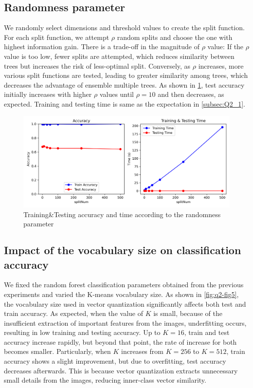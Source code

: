 \subsection{Randomness parameter}
We randomly select dimensions and threshold values to create the split function. For each split function, we attempt $\rho$ random splits and choose the one with highest information gain. There is a trade-off in the magnitude of $\rho$ value: If the $\rho$ value is too low, fewer splits are attempted, which reduces similarity between trees but increases the risk of less-optimal split. Conversely, as $\rho$ increases, more various split functions are tested, leading to greater similarity among trees, which decreases the advantage of ensemble multiple trees. As shown in \cref{fig:q2-fig4}, test accuracy initially increases with higher $\rho$ values until $\rho=10$ and then decreases, as expected. Training and testing time is same as the expectation in \cref{subsec:Q2_1}.

\begin{figure}[htbp]
	\centering
	\includegraphics[width=0.8\linewidth]{image/q2-fig4.png}
	\caption{Training\&Testing accuracy and time according to the randomness parameter}
	\label{fig:q2-fig4}
\end{figure}

\subsection{Impact of the vocabulary size on classification accuracy}
We fixed the random forest classification parameters obtained from the previous experiments and varied the K-means vocabulary size. As shown in \cref{fig:q2-fig5}, the vocabulary size used in vector quantization significantly affects both test and train accuracy. As expected, when the value of $K$ is small, because of the insufficient extraction of important features from the images, underfitting occurs, resulting in low training and testing accuracy. Up to $K=16$, train and test accuracy increase rapidly, but beyond that point, the rate of increase for both becomes smaller. Particularly, when $K$ increases from $K=256$ to $K=512$, train accuracy shows a slight improvement, but due to overfitting, test accuracy decreases afterwards. This is because vector quantization extracts unnecessary small details from the images, reducing inner-class vector similarity.

